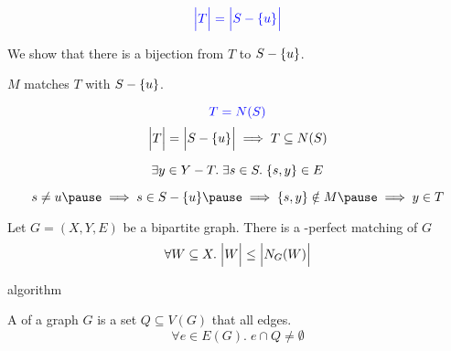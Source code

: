 \begin{frame}{}
  \begin{center}
    \[
      \textcolor{blue}{\Big\lvert T \Big\rvert = \Big\lvert S - \{u\} \Big\rvert}
    \]

    \pause
    \vspace{0.30cm}
    We show that there is a bijection from $T$ to $S - \{u\}$.

    \pause
    $M$ matches $T$ with $S - \{u\}$.
  \end{center}
\end{frame}

\begin{frame}{}
  \begin{center}
    \[
      \textcolor{blue}{T = N(S)}
    \]
    \pause
    \[
      \Big\lvert T \Big\rvert = \Big\lvert S - \{u\} \Big\rvert \implies T \subseteq N(S)
    \]

    \pause
    \pause
    \[
      \exists y \in Y - T.\; \exists s \in S.\; \{s, y\} \in E
    \]

    \pause
    \[
      s \neq u \pause \implies s \in S - \set{u} \pause
                      \implies \set{s, y} \notin M \pause
                      \implies y \in T
    \]
  \end{center}
\end{frame}

\begin{frame}{}
  \begin{theorem}
    Let $G = (X, Y, E)$ be a bipartite graph.
    There is a -perfect matching of $G$ 
    \[
      \forall W \subseteq X.\; \Big\lvert W \Big\rvert \le \Big\lvert N_{G}(W) \Big\rvert
    \]
  \end{theorem}
\end{frame}

\begin{frame}{}
  algorithm
\end{frame}

\begin{frame}{}
  \begin{definitions}
    A  of a graph $G$ is a set $Q \subseteq V(G)$
    that  all edges.
    \[
      \forall e \in E(G).\; e \cap Q \neq \emptyset
    \]
  \end{definitions}

\end{frame}

